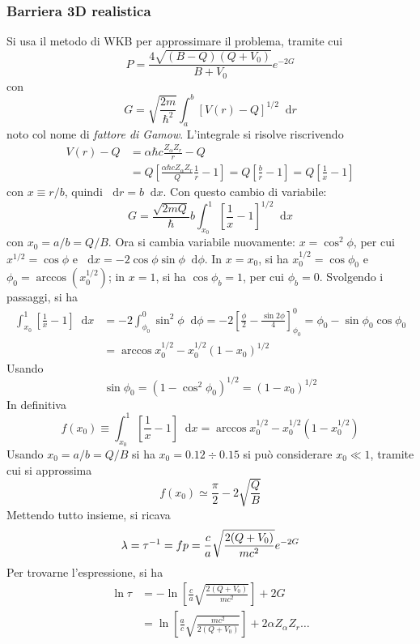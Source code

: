 \documentclass[11pt, a4paper]{scrartcl}
\theoremstyle{style}
\newcommand{\dd}{\mathop{}\!\mathrm{d}}
\numberwithin{equation}{subsection}
\begin{document}
\subsubsection{Barriera 3D realistica}
Si usa il metodo di WKB per approssimare il problema, tramite cui
\[
P = \frac{4 \sqrt{(B-Q)(Q+V_0)}}{B+V_0} e^{- 2 G}
\] 
con 
\[
G = \sqrt{\frac{2m}{ \hbar ^2}}  \int _a^b \left[ V(r) - Q \right]  ^{1 / 2} \dd r
\] 
noto col nome di \textit{fattore di Gamow}.
L'integrale si risolve riscrivendo
\[
\begin{split}
	V(r) - Q & = \alpha  \hbar  c \frac{Z_\alpha Z_r}{r} - Q \\
		 & = Q \left[ \frac{\alpha  \hbar  c Z_\alpha  Z_r}{ Q} \frac{1}{r} - 1 \right]  = Q \left[ \frac{b}{r} -1 \right] = Q \left[ \frac{1}{x} - 1 \right]  
\end{split}
\] 
con $x \equiv r / b$, quindi $\dd r = b \dd x$.
Con questo cambio di variabile:
\[
G = \frac{\sqrt{2m Q} }{\hbar } b \int _{x_0}^1 \left[ \frac{1}{x} - 1 \right] ^{1 / 2} \dd x
\] 
con $x_0 = a / b = Q / B$.
Ora si cambia variabile nuovamente: $x = \cos ^2 \phi $, per cui $x^{1 / 2} = \cos \phi $ e $\dd x = -2 \cos \phi  \sin \phi  \dd \phi $.
In $x=x_0$, si ha $x_0^{1  / 2} = \cos \phi _0$ e $\phi _0 = \operatorname{arccos}( x_0^{1 / 2})$; in $x=1$, si ha $\cos \phi_b = 1 $, per cui $\phi _b = 0 $.
Svolgendo i passaggi, si ha
\[
	\begin{split}
		\int _{x_0}^1 \left[ \frac{1}{x} - 1 \right] \dd x &= -2 \int _{\phi _0}^ 0 \sin^2 \phi  \dd \phi  = -2 \left[ \frac{\phi }{2} - \frac{\sin 2\phi }{4} \right] _{\phi _0}^0 = \phi _0 - \sin \phi _0 \cos \phi _0\\
								  &= \operatorname{arccos} x_0^{1 / 2}- x_0 ^{1 / 2} \left(1 - x_0\right) ^{ 1 / 2}
	\end{split} 
\] 
Usando 
\[
\sin \phi  _0 = (1 - \cos^2\phi _0)^{1 / 2} = (1 - x_0)^{1 / 2}
\] 
In definitiva
\[
f(x_0) \equiv \int_{x_0}^{1 } \left[ \frac{1}{x} - 1 \right]  \dd x = \operatorname{arccos} x_0^{1 / 2} - x_0^{1 / 2} \left(1 - x_0^{1 / 2}\right) 
\] 
Usando $x_0 = a / b = Q / B$ si ha $x_0 = 0.12 \div 0.15$ si pu\`o considerare $x_0 \ll 1$, tramite cui si approssima 
\[
f(x_0) \simeq \frac{\pi}{2} - 2 \sqrt{\frac{Q}{B}} 
\] 
Mettendo tutto insieme, si ricava 
\[
		\lambda = \tau ^{-1} = f p = \frac{c}{a} \sqrt{\frac{2 (Q+V_0)}{mc^2}}  e^{- 2 G}\\
\] 
Per trovarne l'espressione, si ha
\[
	\begin{split}
		\ln \tau  &= -\ln \left[ \frac{c}{a} \sqrt{\frac{2(Q+V_0)}{mc^2}}  \right]  + 2 G\\
			  & = \ln \left[ \frac{a}{c} \sqrt{\frac{mc^2}{2(Q+V_0)}}  \right] + 2 \alpha  Z_\alpha  Z_r \ldots 
	\end{split}
\] 
\end{document}
